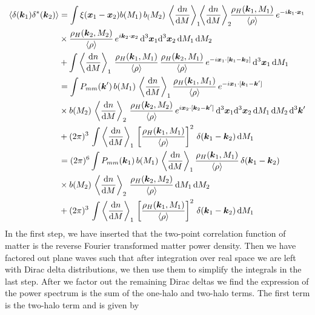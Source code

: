 \documentclass[../main.tex]{subfiles}
\begin{document}
\begin{align}
    \langle \delta(\boldsymbol{k}_1)\delta^*(\boldsymbol{k}_2)\rangle &=  \int \xi(\boldsymbol{x}_1-\boldsymbol{x}_2) b(M_1)\, b_(M_2)\, \left\langle \frac{\mathrm{d} n}{\mathrm{d} M} \right\rangle_1\!\!\left\langle \frac{\mathrm{d} n}{\mathrm{d} M} \right\rangle_2 \!\!\frac{\rho_H(\boldsymbol{k}_1,M_1)}{\langle \rho \rangle}\,e^{-i\boldsymbol{k}_1\cdot\boldsymbol{x}_1} \nonumber \\
    &\times \frac{\rho_H(\boldsymbol{k}_2,M_2)}{\langle \rho \rangle}\,e^{i\boldsymbol{k}_2\cdot\boldsymbol{x}_2} \, \mathrm{d}^3{\boldsymbol{x}}_1 \mathrm{d}^3{\boldsymbol{x}}_2 \,\mathrm{d} M_1\,\mathrm{d} M_2 \nonumber\\
    &+\int \left\langle \frac{\mathrm{d} n}{\mathrm{d} M} \right\rangle_1\,\frac{\rho_H(\boldsymbol{k}_1,M_1)}{\langle \rho \rangle}\,\frac{\rho_H(\boldsymbol{k}_2,M_1)}{\langle \rho \rangle}\,e^{-i\boldsymbol{x}_1\cdot[\boldsymbol{k}_1-\boldsymbol{k}_2]} \,\mathrm{d}^3 \boldsymbol{x}_1 \,\mathrm{d} M_1 \\
    &=  \int P_{mm}(\boldsymbol{k}') \, b(M_1)\, \left\langle \frac{\mathrm{d} n}{\mathrm{d} M} \right\rangle_1 \frac{\rho_H(\boldsymbol{k}_1,M_1)}{\langle \rho \rangle}\,e^{-i \boldsymbol{x}_1\cdot[\boldsymbol{k}_1-\boldsymbol{k}']} \nonumber \\
    &\times  b(M_2)\,\left\langle\frac{\mathrm{d} n}{\mathrm{d} M} \right\rangle_2\,\frac{\rho_H(\boldsymbol{k}_2,M_2)}{\langle \rho \rangle}\,e^{i\boldsymbol{x}_2\cdot[\boldsymbol{k}_2-\boldsymbol{k}']} \, \mathrm{d}^3{\boldsymbol{x}}_1 \mathrm{d}^3{\boldsymbol{x}}_2 \,\mathrm{d} M_1\,\mathrm{d} M_2\,\mathrm{d}^3\boldsymbol{k}' \nonumber\\
    &+(2\pi)^3\,\int \left\langle \frac{\mathrm{d} n}{\mathrm{d} M} \right\rangle_1\,\left[\frac{\rho_H(\boldsymbol{k}_1,M_1)}{\langle \rho \rangle}\right]^2\,\delta(\boldsymbol{k}_1-\boldsymbol{k}_2) \,\mathrm{d} M_1 \\
    &= (2\pi)^6 \int P_{mm}(\boldsymbol{k}_1) \, b(M_1)\, \left\langle \frac{\mathrm{d} n}{\mathrm{d} M} \right\rangle_1 \frac{\rho_H(\boldsymbol{k}_1,M_1)}{\langle \rho \rangle}\,\delta(\boldsymbol{k}_1-\boldsymbol{k}_2) \nonumber \\
    &\times  b(M_2)\,\left\langle\frac{\mathrm{d} n}{\mathrm{d} M} \right\rangle_2\,\frac{\rho_H(\boldsymbol{k}_2,M_2)}{\langle \rho \rangle} \,\mathrm{d} M_1\,\mathrm{d} M_2\nonumber\\
    &+(2\pi)^3\,\int \left\langle \frac{\mathrm{d} n}{\mathrm{d} M} \right\rangle_1\,\left[\frac{\rho_H(\boldsymbol{k}_1,M_1)}{\langle \rho \rangle}\right]^2\,\delta(\boldsymbol{k}_1-\boldsymbol{k}_2)\,\mathrm{d} M_1
\end{align}
In the first step, we have inserted that the two-point correlation function of matter is the reverse Fourier transformed matter power density. Then we have factored out plane waves such that after integration over real space we are left with Dirac delta distributions, we then use them to simplify the integrals in the last step. After we factor out the remaining Dirac deltas we find the expression of the power spectrum is the sum of the one-halo and two-halo terms. The first term is the two-halo term and is given by 
\end{document}
